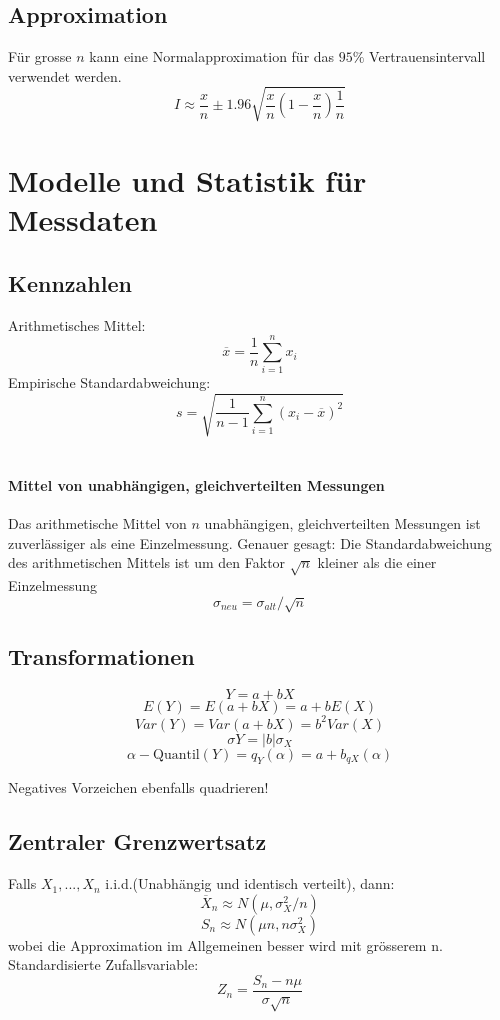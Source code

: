 \documentclass{article}
\begin{document}
\begin{multicols*}{3}
    \subsection{Approximation}

    Für grosse $n$ kann eine Normalapproximation für das $95\%$ Vertrauensintervall verwendet werden.
    $$I \approx \frac{x}{n} \pm 1.96 \sqrt{\frac{x}{n}(1- \frac{x}{n})\frac{1}{n}}$$

\section{Modelle und Statistik für Messdaten}

  \subsection{Kennzahlen}
  Arithmetisches Mittel:
  $${\displaystyle {\overline {x}}={\frac {1}{n}}\sum _{i=1}^{n}{x_{i}}}$$
  Empirische Standardabweichung:
  $${\displaystyle s={\sqrt {{\frac {1}{n-1}}\sum \limits _{i=1}^{n}\left(x_{i}-{\overline {x}}\right)^{2}}}}$$
  \\
  \paragraph{Mittel von unabhängigen, gleichverteilten Messungen}
  Das arithmetische Mittel von $n$ unabhängigen, gleichverteilten Messungen ist zuverlässiger
  als eine Einzelmessung. Genauer gesagt: Die Standardabweichung des arithmetischen Mittels ist um
  den Faktor $\sqrt{n}$ kleiner als die einer Einzelmessung
  $$\sigma _{neu} = \sigma _{alt}/\sqrt{n}$$
  \subsection{Transformationen}


  $$Y=a+bX$$
  $$E(Y) = E(a + bX) = a + b E(X)$$
  $$Var(Y) = Var(a + bX) = b^2 Var(X)$$
  $$\sigma Y = |b|\sigma _X$$
  $$\alpha -\text{Quantil}(Y) = q_Y (\alpha) = a + b_{qX}(\alpha)$$

  Negatives Vorzeichen ebenfalls quadrieren!

  \subsection{Zentraler Grenzwertsatz}
  Falls $X_1,...,X_n$ i.i.d.(Unabhängig und identisch verteilt), dann: \\
  $$\overline{X}_n \approx N(\mu, \sigma ^2_X/n)$$
  $$S_n \approx N(\mu n, n\sigma^2_X)$$
  wobei die Approximation im Allgemeinen besser wird mit grösserem n. \\
  Standardisierte Zufallsvariable:
  $$Z_{n}={\frac  {S_{n}-n\mu }{\sigma {\sqrt  {n}}}}$$


\end{multicols*}
\end{document}
